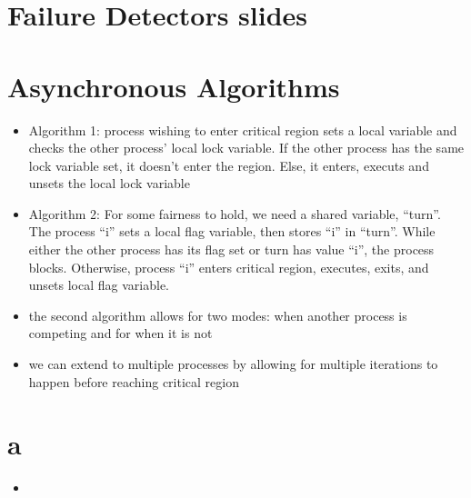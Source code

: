 \documentclass[a4paper,10pt,]{article}
\begin{document}
\section{Failure Detectors slides}

\section{Asynchronous Algorithms}
\begin{itemize}
\item Algorithm 1: process wishing to enter critical region sets a local variable and checks the other process' local lock variable.  If the other process has the same lock variable set, it doesn't enter the region.  Else, it enters, executs and unsets the local lock variable
\item Algorithm 2: For some fairness to hold, we need a shared variable, ``turn''.  The process ``i'' sets a local flag variable, then stores ``i'' in ``turn''.  While either the other process has its flag set or turn has value ``i'', the process blocks. Otherwise, process ``i'' enters critical region, executes, exits, and unsets local flag variable.
\item the second algorithm allows for two modes: when another process is competing and for when it is not
\item we can extend to multiple processes by allowing for multiple iterations to happen before reaching critical region
\end{itemize}

\section{a}
\begin{itemize}
\item 
\end{itemize}
\end{document}
